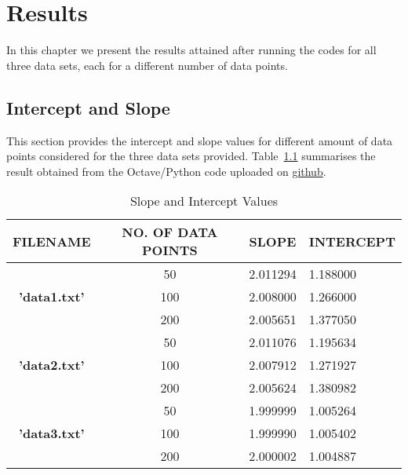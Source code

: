\documentclass[a4paper, 12pt]{report}
\begin{document}
\chapter{Results}
In this chapter we present the results attained after running the codes for all three data sets, each for a different number of data points.
\section{Intercept and Slope}
This section provides the intercept and slope values for different amount of data points considered for the three data sets provided. Table~\ref{Slope and Intercept} summarises the result obtained from the Octave/Python code uploaded on \href{https://github.com/YashIITM/Linear-Regression-Using-Octave-and-Python}{github}.

\begin{table}[h]
\begin{tabular}{|c|c|l|l|}
\hline
\textbf{FILENAME} & \textbf{NO. OF DATA POINTS} & \multicolumn{1}{c|}{\textbf{SLOPE}} & \multicolumn{1}{c|}{\textbf{INTERCEPT}} \\ \hline
\multirow{3}{*}{\textbf{'data1.txt'}} & 50  & 2.011294 & 1.188000 \\ \cline{2-4} 
                                      & 100 & 2.008000 & 1.266000 \\ \cline{2-4} 
                                      & 200 & 2.005651 & 1.377050 \\ \hline
\multirow{3}{*}{\textbf{'data2.txt'}} & 50  & 2.011076 & 1.195634 \\ \cline{2-4} 
                                      & 100 & 2.007912 & 1.271927 \\ \cline{2-4} 
                                      & 200 & 2.005624 & 1.380982 \\ \hline
\multirow{3}{*}{\textbf{'data3.txt'}} & 50  & 1.999999 & 1.005264 \\ \cline{2-4} 
                                      & 100 & 1.999990 & 1.005402 \\ \cline{2-4} 
                                      & 200 & 2.000002 & 1.004887 \\ \hline
\end{tabular}
\caption{Slope and Intercept Values}
\label{Slope and Intercept}
\end{table}
\end{document}
